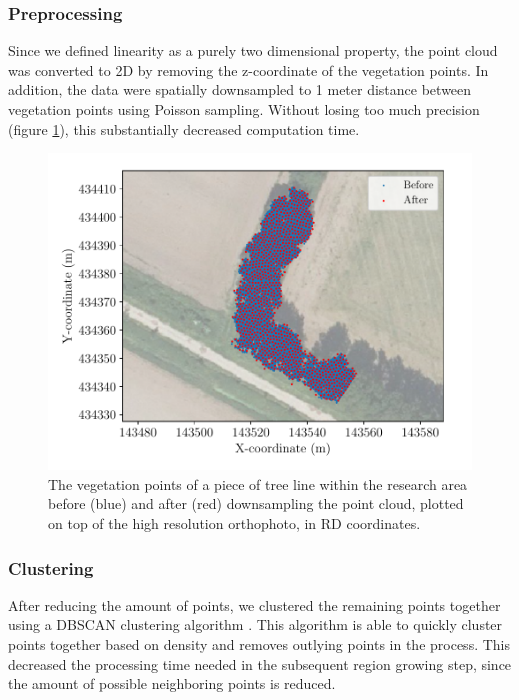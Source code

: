 \subsubsection{Preprocessing}
Since we defined linearity as a purely two dimensional property, the point cloud was converted to 2D by removing the z-coordinate of the vegetation points. In addition, the data were spatially downsampled to 1 meter distance between vegetation points using Poisson sampling. Without losing too much precision (figure \ref{fig:downsampling}), this substantially decreased computation time.

\begin{figure}
	\centering
	\includegraphics[scale=0.80]{./img/downsampling.pdf}
	\caption{The vegetation points of a piece of tree line within the research area before (blue) and after (red) downsampling the point cloud, plotted on top of the high resolution orthophoto, in RD coordinates.}
	\label{fig:downsampling}
\end{figure}

\subsubsection{Clustering}
After reducing the amount of points, we clustered the remaining points together using a DBSCAN clustering algorithm \citep{ester1996density}. This algorithm is able to quickly cluster points together based on density and removes outlying points in the process. This decreased the processing time needed in the subsequent region growing step, since the amount of possible neighboring points is reduced.

